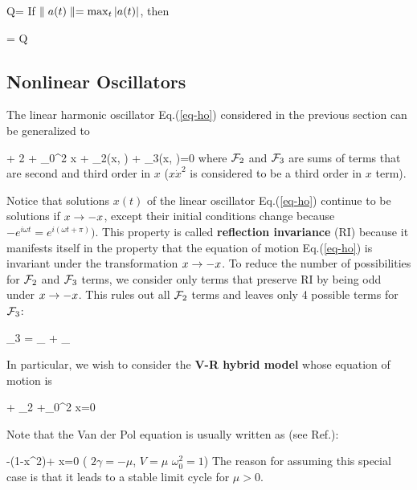 \beq
Q= 
\eeq
If $\parallel a(t)\parallel=\max_t|a(t)|$, then

\beq
{}
\approx
{}
=
Q
\eeq


\subsection{Nonlinear Oscillators}
The linear harmonic oscillator
Eq.(\ref{eq-ho})
considered in the previous
section can be
generalized to
 
\beq
{} + 2\gamma {} + \omega_0^2 x + \calf_2(x, )  + \calf_3(x, )=0
\eeq
where ${\cal F}_2$ and ${\cal F}_3$ are sums of terms  that are second and third order in $x$ ($x\dot{x}^2$ is
considered to be a third order in $x$ term).

Notice that solutions $x(t)$
of the linear oscillator
Eq.(\ref{eq-ho})
continue to be solutions if $x\rightarrow -x$, except their initial conditions change because $-e^{i\omega t}= e^{i(\omega t +\pi)})$.
This property is called {\bf
reflection invariance} (RI)
because it manifests itself in the property that the equation
of motion Eq.(\ref{eq-ho})
is invariant under the
transformation $x\rightarrow -x$.
To reduce the number of possibilities for ${\cal F}_2$ and
${\cal F}_3$ terms, we
consider only terms that 
preserve RI by being odd under
$x\rightarrow -x$.
This rules out all ${\cal F}_2$ terms
and leaves only 4 possible terms for ${\cal F}_3$:

\beq 
\calf_3 = _{}
+ _{}
\eeq

In particular,
we wish to consider the {\bf V-R hybrid model}
whose equation of motion is

\beq
{} + _{2\TIL{\gamma}}
 +\omega_0^2 x=0
\eeq

Note that the Van der Pol equation is usually written as
(see Ref.\cite{wiki-van-der-pol}):

\beq {}  -\mu(1-x^2)+ x=0
\quad (\text
 {$2\gamma = -\mu$, $V=\mu$
$\omega^2_0=1$})
\eeq
The reason for
assuming this special case is that it leads to a 
stable limit cycle for $\mu>0$. 

